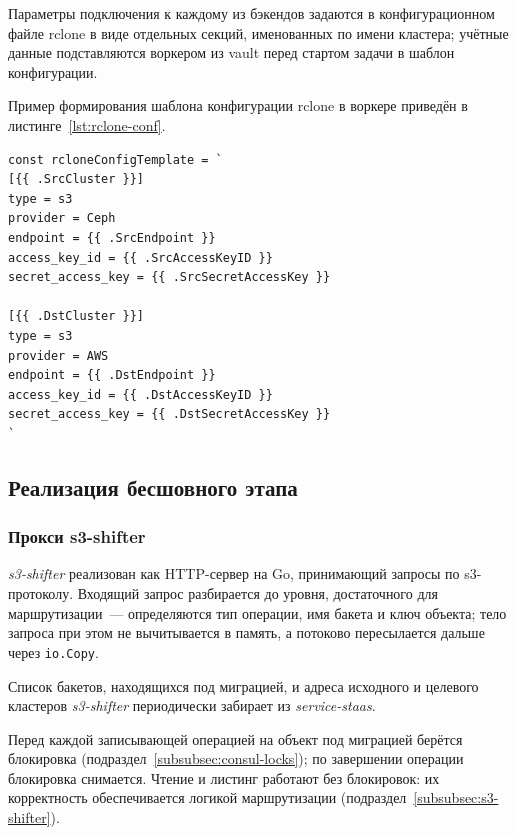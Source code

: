 Параметры подключения к каждому из бэкендов задаются в конфигурационном файле rclone в виде отдельных секций, именованных по имени кластера; учётные данные подставляются воркером из \gls{vault} перед стартом задачи в шаблон конфигурации.

Пример формирования шаблона конфигурации rclone в воркере приведён в листинге~\ref{lst:rclone-conf}.

\begin{listing}[ht]
\begin{verbatim}
const rcloneConfigTemplate = `
[{{ .SrcCluster }}]
type = s3
provider = Ceph
endpoint = {{ .SrcEndpoint }}
access_key_id = {{ .SrcAccessKeyID }}
secret_access_key = {{ .SrcSecretAccessKey }}

[{{ .DstCluster }}]
type = s3
provider = AWS
endpoint = {{ .DstEndpoint }}
access_key_id = {{ .DstAccessKeyID }}
secret_access_key = {{ .DstSecretAccessKey }}
`
\end{verbatim}
\caption{Шаблон конфигурации rclone, формируемый воркером}
\label{lst:rclone-conf}
\end{listing}

\subsection{Реализация бесшовного этапа}\label{subsec:impl-seamless}

\subsubsection{Прокси s3-shifter}\label{subsubsec:impl-shifter}

\textit{s3-shifter} реализован как HTTP-сервер на Go, принимающий запросы по \gls{s3}-протоколу.
Входящий запрос разбирается до уровня, достаточного для маршрутизации~--- определяются тип операции, имя бакета и ключ объекта; тело запроса при этом не вычитывается в память, а потоково пересылается дальше через \texttt{io.Copy}.

Список бакетов, находящихся под миграцией, и адреса исходного и целевого кластеров \textit{s3-shifter} периодически забирает из \textit{service-staas}.

Перед каждой записывающей операцией на объект под миграцией берётся блокировка (подраздел~\ref{subsubsec:consul-locks}); по завершении операции блокировка снимается.
Чтение и листинг работают без блокировок: их корректность обеспечивается логикой маршрутизации (подраздел~\ref{subsubsec:s3-shifter}).

